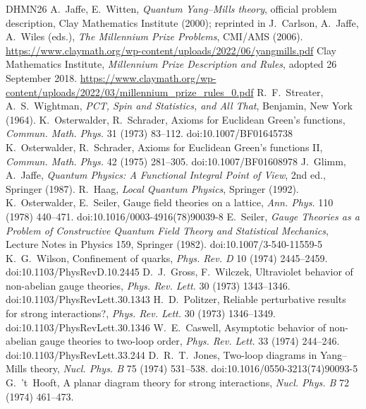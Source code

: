 \documentclass[11pt,a4paper]{article}
\begin{document}
\begin{thebibliography}{DHMN26}
\small
{} A.~Jaffe, E.~Witten, \emph{Quantum Yang--Mills theory}, official problem description, Clay Mathematics Institute (2000); reprinted in J.~Carlson, A.~Jaffe, A.~Wiles (eds.), \emph{The Millennium Prize Problems}, CMI/AMS (2006). \url{https://www.claymath.org/wp-content/uploads/2022/06/yangmills.pdf}
 Clay Mathematics Institute, \emph{Millennium Prize Description and Rules}, adopted 26 September 2018. \url{https://www.claymath.org/wp-content/uploads/2022/03/millennium_prize_rules_0.pdf}
 R.~F.~Streater, A.~S.~Wightman, \emph{PCT, Spin and Statistics, and All That}, Benjamin, New York (1964).
 K.~Osterwalder, R.~Schrader, Axioms for Euclidean Green's functions, \emph{Commun. Math. Phys.} 31 (1973) 83--112. doi:10.1007/BF01645738
 K.~Osterwalder, R.~Schrader, Axioms for Euclidean Green's functions II, \emph{Commun. Math. Phys.} 42 (1975) 281--305. doi:10.1007/BF01608978
 J.~Glimm, A.~Jaffe, \emph{Quantum Physics: A Functional Integral Point of View}, 2nd ed., Springer (1987).
 R.~Haag, \emph{Local Quantum Physics}, Springer (1992).
 K.~Osterwalder, E.~Seiler, Gauge field theories on a lattice, \emph{Ann. Phys.} 110 (1978) 440--471. doi:10.1016/0003-4916(78)90039-8
 E.~Seiler, \emph{Gauge Theories as a Problem of Constructive Quantum Field Theory and Statistical Mechanics}, Lecture Notes in Physics 159, Springer (1982). doi:10.1007/3-540-11559-5
 K.~G.~Wilson, Confinement of quarks, \emph{Phys. Rev. D} 10 (1974) 2445--2459. doi:10.1103/PhysRevD.10.2445
 D.~J.~Gross, F.~Wilczek, Ultraviolet behavior of non-abelian gauge theories, \emph{Phys. Rev. Lett.} 30 (1973) 1343--1346. doi:10.1103/PhysRevLett.30.1343
 H.~D.~Politzer, Reliable perturbative results for strong interactions?, \emph{Phys. Rev. Lett.} 30 (1973) 1346--1349. doi:10.1103/PhysRevLett.30.1346
 W.~E.~Caswell, Asymptotic behavior of non-abelian gauge theories to two-loop order, \emph{Phys. Rev. Lett.} 33 (1974) 244--246. doi:10.1103/PhysRevLett.33.244
 D.~R.~T.~Jones, Two-loop diagrams in Yang--Mills theory, \emph{Nucl. Phys. B} 75 (1974) 531--538. doi:10.1016/0550-3213(74)90093-5
 G.~'t~Hooft, A planar diagram theory for strong interactions, \emph{Nucl. Phys. B} 72 (1974) 461--473.

\end{thebibliography}
\end{document}
